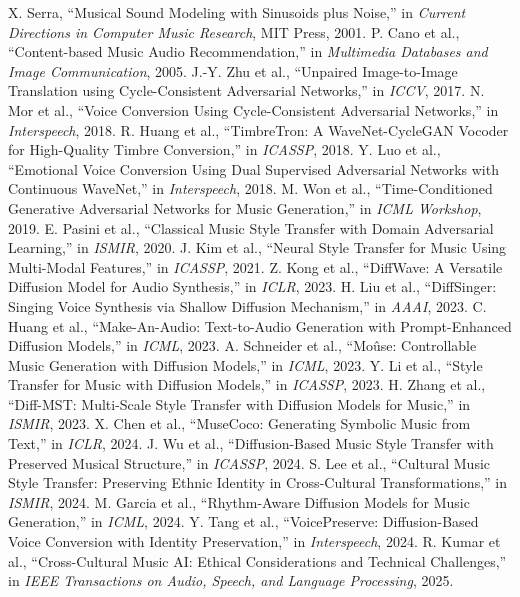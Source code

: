 \documentclass[conference]{IEEEtran}
\begin{document}
\begin{thebibliography}{00}
 X. Serra, ``Musical Sound Modeling with Sinusoids plus Noise,'' in \textit{Current Directions in Computer Music Research}, MIT Press, 2001.
 P. Cano et al., ``Content-based Music Audio Recommendation,'' in \textit{Multimedia Databases and Image Communication}, 2005.
 J.-Y. Zhu et al., ``Unpaired Image-to-Image Translation using Cycle-Consistent Adversarial Networks,'' in \textit{ICCV}, 2017.
 N. Mor et al., ``Voice Conversion Using Cycle-Consistent Adversarial Networks,'' in \textit{Interspeech}, 2018.
 R. Huang et al., ``TimbreTron: A WaveNet-CycleGAN Vocoder for High-Quality Timbre Conversion,'' in \textit{ICASSP}, 2018.
 Y. Luo et al., ``Emotional Voice Conversion Using Dual Supervised Adversarial Networks with Continuous WaveNet,'' in \textit{Interspeech}, 2018.
 M. Won et al., ``Time-Conditioned Generative Adversarial Networks for Music Generation,'' in \textit{ICML Workshop}, 2019.
 E. Pasini et al., ``Classical Music Style Transfer with Domain Adversarial Learning,'' in \textit{ISMIR}, 2020.
 J. Kim et al., ``Neural Style Transfer for Music Using Multi-Modal Features,'' in \textit{ICASSP}, 2021.
 Z. Kong et al., ``DiffWave: A Versatile Diffusion Model for Audio Synthesis,'' in \textit{ICLR}, 2023.
 H. Liu et al., ``DiffSinger: Singing Voice Synthesis via Shallow Diffusion Mechanism,'' in \textit{AAAI}, 2023.
 C. Huang et al., ``Make-An-Audio: Text-to-Audio Generation with Prompt-Enhanced Diffusion Models,'' in \textit{ICML}, 2023.
 A. Schneider et al., ``Mo\^{u}se: Controllable Music Generation with Diffusion Models,'' in \textit{ICML}, 2023.
 Y. Li et al., ``Style Transfer for Music with Diffusion Models,'' in \textit{ICASSP}, 2023.
 H. Zhang et al., ``Diff-MST: Multi-Scale Style Transfer with Diffusion Models for Music,'' in \textit{ISMIR}, 2023.
 X. Chen et al., ``MuseCoco: Generating Symbolic Music from Text,'' in \textit{ICLR}, 2024.
 J. Wu et al., ``Diffusion-Based Music Style Transfer with Preserved Musical Structure,'' in \textit{ICASSP}, 2024.
 S. Lee et al., ``Cultural Music Style Transfer: Preserving Ethnic Identity in Cross-Cultural Transformations,'' in \textit{ISMIR}, 2024.
 M. Garcia et al., ``Rhythm-Aware Diffusion Models for Music Generation,'' in \textit{ICML}, 2024.
 Y. Tang et al., ``VoicePreserve: Diffusion-Based Voice Conversion with Identity Preservation,'' in \textit{Interspeech}, 2024.
 R. Kumar et al., ``Cross-Cultural Music AI: Ethical Considerations and Technical Challenges,'' in \textit{IEEE Transactions on Audio, Speech, and Language Processing}, 2025.
\end{thebibliography}
\end{document}
